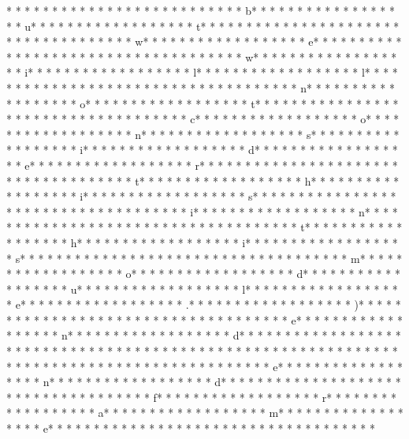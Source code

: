  * * *  *  * * *  *  * * *  * * *  * * *  *  * * *  *  * * *  * b* * *  * * *  * * *  *  * * *  *  * * *  * u* * *  * * *  * * *  *  * * *  *  * * *  * t* * *  * * *  * * *  *  * * *  *  * * *  *  * * *  * * *  * * *  *  * * *  *  * * *  * w* * *  * * *  * * *  *  * * *  *  * * *  * e* * *  * * *  * * *  *  * * *  *  * * *  *  * * *  * * *  * * *  *  * * *  *  * * *  * w* * *  * * *  * * *  *  * * *  *  * * *  * i* * *  * * *  * * *  *  * * *  *  * * *  * l* * *  * * *  * * *  *  * * *  *  * * *  * l* * *  * * *  * * *  *  * * *  *  * * *  *  * * *  * * *  * * *  *  * * *  *  * * *  * n* * *  * * *  * * *  *  * * *  *  * * *  * o* * *  * * *  * * *  *  * * *  *  * * *  * t* * *  * * *  * * *  *  * * *  *  * * *  *  * * *  * * *  * * *  *  * * *  *  * * *  * c* * *  * * *  * * *  *  * * *  *  * * *  * o* * *  * * *  * * *  *  * * *  *  * * *  * n* * *  * * *  * * *  *  * * *  *  * * *  * s* * *  * * *  * * *  *  * * *  *  * * *  * i* * *  * * *  * * *  *  * * *  *  * * *  * d* * *  * * *  * * *  *  * * *  *  * * *  * e* * *  * * *  * * *  *  * * *  *  * * *  * r* * *  * * *  * * *  *  * * *  *  * * *  *  * * *  * * *  * * *  *  * * *  *  * * *  * t* * *  * * *  * * *  *  * * *  *  * * *  * h* * *  * * *  * * *  *  * * *  *  * * *  * i* * *  * * *  * * *  *  * * *  *  * * *  * s* * *  * * *  * * *  *  * * *  *  * * *  *  * * *  * * *  * * *  *  * * *  *  * * *  * i* * *  * * *  * * *  *  * * *  *  * * *  * n* * *  * * *  * * *  *  * * *  *  * * *  *  * * *  * * *  * * *  *  * * *  *  * * *  * t* * *  * * *  * * *  *  * * *  *  * * *  * h* * *  * * *  * * *  *  * * *  *  * * *  * i* * *  * * *  * * *  *  * * *  *  * * *  * s* * *  * * *  * * *  *  * * *  *  * * *  *  * * *  * * *  * * *  *  * * *  *  * * *  * m* * *  * * *  * * *  *  * * *  *  * * *  * o* * *  * * *  * * *  *  * * *  *  * * *  * d* * *  * * *  * * *  *  * * *  *  * * *  * u* * *  * * *  * * *  *  * * *  *  * * *  * l* * *  * * *  * * *  *  * * *  *  * * *  * e* * *  * * *  * * *  *  * * *  *  * * *  * .* * *  * * *  * * *  *  * * *  *  * * *  * )* * *  * * *  * * *  *  * * *  *  * * *  * 
* * *  * * *  * * *  *  * * *  *  * * *  * e* * *  * * *  * * *  *  * * *  *  * * *  * n* * *  * * *  * * *  *  * * *  *  * * *  * d* * *  * * *  * * *  *  * * *  *  * * *  * {* * *  * * *  * * *  *  * * *  *  * * *  *  * * *  * * *  * * *  *  * * *  *  * * *  * }* * *  * * *  * * *  *  * * *  *  * * *  * 
* * *  * * *  * * *  *  * * *  *  * * *  * e* * *  * * *  * * *  *  * * *  *  * * *  * n* * *  * * *  * * *  *  * * *  *  * * *  * d* * *  * * *  * * *  *  * * *  *  * * *  * {* * *  * * *  * * *  *  * * *  *  * * *  * f* * *  * * *  * * *  *  * * *  *  * * *  * r* * *  * * *  * * *  *  * * *  *  * * *  * a* * *  * * *  * * *  *  * * *  *  * * *  * m* * *  * * *  * * *  *  * * *  *  * * *  * e* * *  * * *  * * *  *  * * *  *  * * *  * }* * *  * * *  * * *  *  * * *  *  * * *  * 
